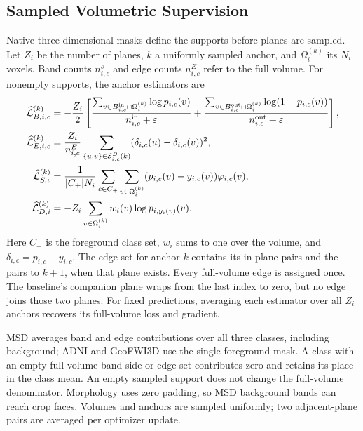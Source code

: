 \documentclass[12pt,a4paper]{article}
\begin{document}
\subsection{Sampled Volumetric Supervision}
\label{sec:sampled-pretrained-supervision}

Native three-dimensional masks define the supports before planes are
sampled. Let $Z_i$ be the number of planes, $k$ a uniformly sampled
anchor, and $\Omega_i^{(k)}$ its $N_i$ voxels. Band counts $n_{i,c}^s$
and edge counts $n_{i,c}^E$ refer to the full volume. For nonempty
supports, the anchor estimators are
\begin{align}
\widehat{\mathcal L}_{B,i,c}^{(k)}
 &=-\frac{Z_i}{2}\left[
 \frac{\sum_{v\in B_{i,c}^{\rm in}\cap\Omega_i^{(k)}}\log p_{i,c}(v)}{n_{i,c}^{\rm in}+\varepsilon}
 +\frac{\sum_{v\in B_{i,c}^{\rm out}\cap\Omega_i^{(k)}}\log(1-p_{i,c}(v))}{n_{i,c}^{\rm out}+\varepsilon}
 \right],\label{eq:medsam-sampled-band-loss}\\
\widehat{\mathcal L}_{E,i,c}^{(k)}
 &=\frac{Z_i}{n_{i,c}^E}\sum_{\{u,v\}\in\mathcal E_{i,c}^B(k)}
 (\delta_{i,c}(u)-\delta_{i,c}(v))^2,\label{eq:medsam-sampled-edge-loss}\\
\widehat{\mathcal L}_{S,i}^{(k)}
 &=\frac{1}{|C_+|N_i}\sum_{c\in C_+}\sum_{v\in\Omega_i^{(k)}}
 (p_{i,c}(v)-y_{i,c}(v))\varphi_{i,c}(v),\label{eq:medsam-sampled-sdf}\\
\widehat{\mathcal L}_{D,i}^{(k)}
 &=-Z_i\sum_{v\in\Omega_i^{(k)}}w_i(v)\log p_{i,y_i(v)}(v).
 \label{eq:medsam-sampled-depth}
\end{align}
Here $C_+$ is the foreground class set, $w_i$ sums to one over the
volume, and $\delta_{i,c}=p_{i,c}-y_{i,c}$. The edge set for anchor $k$
contains its in-plane pairs and the pairs to $k+1$, when that plane
exists. Every full-volume edge is assigned once. The baseline's
companion plane wraps from the last index to zero, but no edge joins
those two planes. For fixed predictions, averaging each estimator over
all $Z_i$ anchors recovers its full-volume loss and gradient.

MSD averages band and edge contributions over all three classes,
including background; ADNI and GeoFWI3D use the single foreground
mask. A class with an empty full-volume band side or edge set contributes
zero and retains its place in the class mean. An empty sampled support
does not change the full-volume denominator. Morphology uses zero
padding, so MSD background bands can reach crop faces. Volumes and
anchors are sampled uniformly; two adjacent-plane pairs are averaged
per optimizer update.
\end{document}
